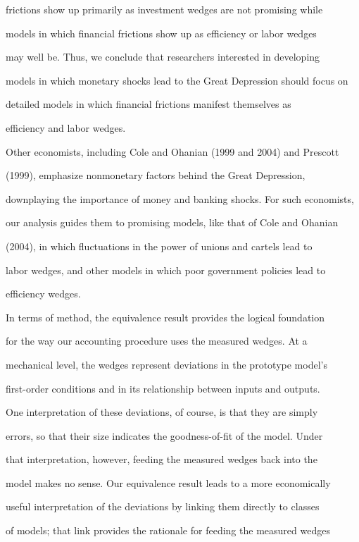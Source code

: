 \documentclass[fleqn,leqno,11pt]{article}
\begin{document}
frictions show up primarily as investment wedges are not promising while

models in which financial frictions show up as efficiency or labor wedges

may well be. Thus, we conclude that researchers interested in developing

models in which monetary shocks lead to the Great Depression should focus on

detailed models in which financial frictions manifest themselves as

efficiency and labor wedges.



Other economists, including Cole and Ohanian (1999 and 2004) and Prescott

(1999), emphasize nonmonetary factors behind the Great Depression,

downplaying the importance of money and banking shocks. For such economists,

our analysis guides them to promising models, like that of Cole and Ohanian

(2004), in which fluctuations in the power of unions and cartels lead to

labor wedges, and other models in which poor government policies lead to

efficiency wedges.



In terms of method, the equivalence result provides the logical foundation

for the way our accounting procedure uses the measured wedges. At a

mechanical level, the wedges represent deviations in the prototype model's

first-order conditions and in its relationship between inputs and outputs.

One interpretation of these deviations, of course, is that they are simply

errors, so that their size indicates the goodness-of-fit of the model. Under

that interpretation, however, feeding the measured wedges back into the

model makes no sense. Our equivalence result leads to a more economically

useful interpretation of the deviations by linking them directly to classes

of models; that link provides the rationale for feeding the measured wedges
\end{document}
